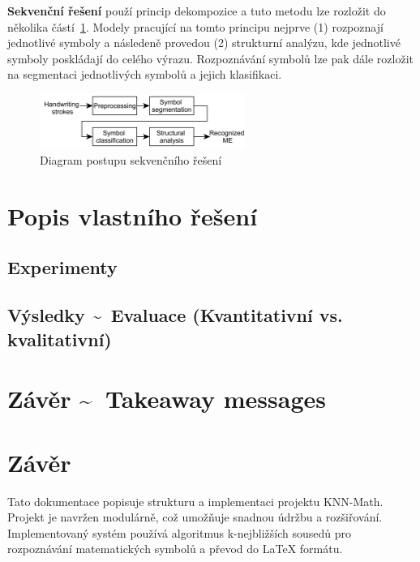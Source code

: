 \textbf{Sekvenční řešení} použí princip dekompozice a tuto metodu lze rozložit do několika částí~\ref{img:seq_sol}. Modely pracující na tomto principu nejprve (1) rozpoznají jednotlivé symboly a následeně provedou (2) strukturní analýzu, kde jednotlivé symboly poskládají do celého výrazu. Rozpoznávání symbolů lze pak dále rozložit na segmentaci jednotlivých symbolů a jejich klasifikaci. 

\begin{figure}[h!]
    \centering
    \includegraphics[width=0.6\textwidth]{img/sequential_sol.png}
    \caption{Diagram postupu sekvenčního řešení}
    \label{img:seq_sol}
\end{figure}







\section{Popis vlastního řešení}

\subsection{Experimenty}

\subsection{Výsledky \~~Evaluace (Kvantitativní vs. kvalitativní)}	

\section{Závěr \~~Takeaway messages}


\newpage
\section{Závěr}
Tato dokumentace popisuje strukturu a implementaci projektu KNN-Math. Projekt je navržen modulárně, což umožňuje snadnou údržbu a rozšiřování. Implementovaný systém používá algoritmus k-nejbližších sousedů pro rozpoznávání matematických symbolů a převod do LaTeX formátu.





